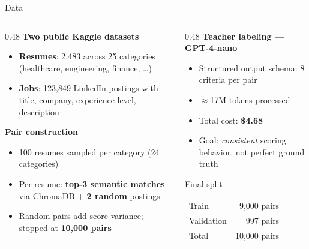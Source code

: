 \documentclass[aspectratio=169,11pt]{beamer}
\newcommand{\highlight}[1]{\textcolor{accentblue}{\textbf{#1}}}
\begin{document}
\begin{frame}{Data}
\begin{columns}[T]
\begin{column}{0.48\textwidth}
  \small
  \textbf{Two public Kaggle datasets}
  \begin{itemize}
    \setlength\itemsep{0.1em}
    \item \textbf{Resumes}: 2,483 across 25 categories (healthcare, engineering, finance, \ldots)
    \item \textbf{Jobs}: 123,849 LinkedIn postings with title, company, experience level, description
  \end{itemize}
  \textbf{Pair construction}
  \begin{itemize}
    \setlength\itemsep{0.1em}
    \item 100 resumes sampled per category (24 categories)
    \item Per resume: \textbf{top-3 semantic matches} via ChromaDB + \textbf{2 random} postings
    \item Random pairs add score variance; stopped at \highlight{10,000 pairs}
  \end{itemize}
\end{column}
\begin{column}{0.48\textwidth}
  \small
  \textbf{Teacher labeling --- GPT-4-nano}
  \begin{itemize}
    \setlength\itemsep{0.1em}
    \item Structured output schema: 8 criteria per pair
    \item $\approx$17M tokens processed
    \item Total cost: \highlight{\$4.68}
    \item Goal: \emph{consistent} scoring behavior, not perfect ground truth
  \end{itemize}
  \begin{block}{Final split}
    \centering\small
    \begin{tabular}{lr}
      Train      & 9,000 pairs \\
      Validation &   997 pairs \\
      \midrule
      Total      & 10,000 pairs \\
    \end{tabular}
  \end{block}
\end{column}
\end{columns}
\end{frame}
\end{document}
